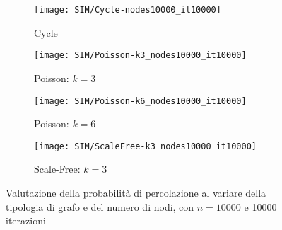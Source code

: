     \begin{figure}[H]
        \begin{minipage}{\linewidth}
            \centering
            \begin{minipage}{0.45\linewidth}
                \begin{figure}[H]
                \texttt{[image: SIM/Cycle-nodes10000\_it10000]}\caption{Cycle}
                \label{fig:sim_cycle}
                \end{figure}
            \end{minipage}
            \hspace{0.05\linewidth}
            \begin{minipage}{0.45\linewidth}
                \begin{figure}[H]
                \texttt{[image: SIM/Poisson-k3\_nodes10000\_it10000]}\caption{Poisson: $k=3$}
                \label{fig:sim_poisson_k_3}
                \end{figure}
            \end{minipage}
            \begin{minipage}{0.45\linewidth}
                \begin{figure}[H]
                \texttt{[image: SIM/Poisson-k6\_nodes10000\_it10000]}\caption{Poisson: $k=6$}
                \label{fig:sim_poisson_k_6}
                \end{figure}
            \end{minipage}
            \hspace{0.05\linewidth}
            \begin{minipage}{0.45\linewidth}
                \begin{figure}[H]
                \texttt{[image: SIM/ScaleFree-k3\_nodes10000\_it10000]}\caption{Scale-Free: $k=3$}
                \label{fig:sim_scale_free_k_3}
                \end{figure}
            \end{minipage}
            \caption{Valutazione della probabilità di percolazione al variare della tipologia di grafo e del numero di nodi,
            con $n=10000$ e 10000 iterazioni}
        \end{minipage}
    \end{figure}

